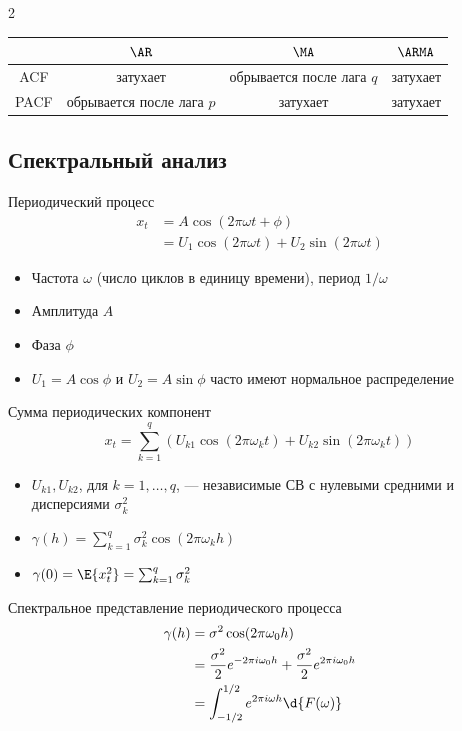\documentclass[landscape]{article}
\renewcommand{\rv}{СВ\xspace}
\begin{document}
\begin{multicols*}{2}
\begin{center}
  \begin{tabular}{|c|ccc|}
    \hline
    & $\AR$ & $\MA$ & $\ARMA$\\
    \hline
    ACF & затухает & обрывается после лага $q$ & затухает \\
    PACF & обрывается после лага $p$ & затухает & затухает \\
    \hline
  \end{tabular}
\end{center}

\subsection{Спектральный анализ}

Периодический процесс
\begin{align*}
  x_t
  &= A \cos(2\pi\omega t + \phi) \\
  &= U_1 \cos(2\pi \omega t) + U_2 \sin(2\pi \omega t)
\end{align*}

\begin{itemize}
  \item Частота $\omega$ (число циклов в единицу времени),
    период $1/\omega$
  \item Амплитуда $A$
  \item Фаза $\phi$
  \item $U_1 = A\cos\phi$ и $U_2 = A\sin\phi$ часто имеют нормальное распределение
\end{itemize}

Сумма периодических компонент
\[x_t = \sum_{k=1}^q\left( U_{k1}\cos(2\pi\omega_k t)
+ U_{k2}\sin(2\pi\omega_k t)
\right)\]
\begin{itemize}
  \item $U_{k1}, U_{k2}$, для $k=1,\ldots,q$,
    — независимые \rv с нулевыми средними и дисперсиями $\sigma_k^2$
  \item $\gamma(h) = \sum_{k=1}^q \sigma_k^2 \cos(2\pi\omega_k h)$
  \item $\gamma(0) = \E{x_t^2} = \sum_{k=1}^q \sigma_k^2$
\end{itemize}

Спектральное представление периодического процесса
\begin{align*}
\gamma(h)
&= \sigma^2 \cos(2\pi\omega_0 h) \\
&= \frac{\sigma^2}{2} e^{-2\pi i \omega_0 h}
+ \frac{\sigma^2}{2} e^{2\pi i \omega_0 h}\\
&= \int_{-1/2}^{1/2} e^{2\pi i \omega h} \d{F(\omega)}
\end{align*}


\end{multicols*}
\end{document}

